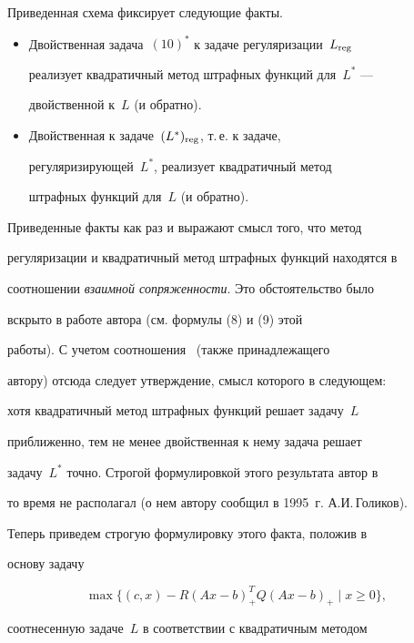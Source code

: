Приведенная схема фиксирует следующие факты.


\begin{itemize}


\item[1)] Двойственная задача~$(10)^*$ к задаче регуляризации~$L_{\operatorname{reg}}$


реализует квадратичный метод штрафных функций для~$L^*$ ---


двойственной к~$L$ (и обратно).


\item[2)] Двойственная к задаче~$(L^*)_{\operatorname{reg}}$, т.\,е.{} к задаче,


регуляризирующей~$L^*$, реализует квадратичный метод


штрафных функций для~$L$ (и обратно).


\end{itemize}


Приведенные факты как раз и выражают смысл того, что метод


регуляризации и квадратичный метод штрафных функций находятся в


соотношении {\it взаимной сопряженности}. Это обстоятельство было


вскрыто в работе автора \cite{3} (см.{} формулы (8) и (9) этой


работы). С учетом соотношения~ (также принадлежащего


автору) отсюда следует утверждение, смысл которого в следующем:


хотя квадратичный метод штрафных функций решает задачу~$L$


приближенно, тем не менее двойственная к нему задача решает


задачу~$L^*$ точно. Строгой формулировкой этого результата автор в


то время не располагал (о нем автору сообщил в 1995~г. А.И.\,Голиков).





Теперь приведем строгую формулировку этого факта, положив в


основу задачу


\begin{equation}


\label{f15}


\max \{ (c, x) -R (Ax-b)_+^T Q (Ax-b)_+ \mid x\geq 0\},


\end{equation}


соотнесенную задаче~$L$ в соответствии с квадратичным методом


